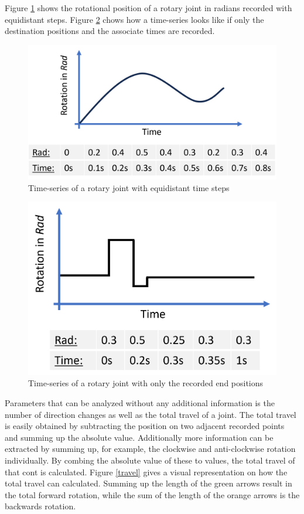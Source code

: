 Figure \ref{equi} shows the rotational position of a rotary joint in radians recorded with equidistant steps. Figure \ref{onchange} chows how a time-series looks like if only the destination positions and the associate times are recorded.

\begin{figure}[H]
	\centerline{\includegraphics[scale=.55]{figures/equi.png}}
	\caption{Time-series of a rotary joint with equidistant time steps}
	\label{equi}
\end{figure}

\begin{figure}[H]
	\centerline{\includegraphics[scale=.55]{figures/onchange.png}}
	\caption{Time-series of a rotary joint with only the recorded end positions}
	\label{onchange}
\end{figure}


Parameters that can be analyzed without any additional information is the number of direction changes as well as the total travel of a joint. The total travel is easily obtained by subtracting the position on two adjacent recorded points and summing up the absolute value. Additionally more information can be extracted by summing up, for example, the clockwise and anti-clockwise rotation individually. By combing the absolute value of these to values, the total travel of that cont is calculated.
Figure \ref{travel} gives a visual representation on how the total travel can calculated. Summing up the length of the green arrows result in the total forward rotation, while the sum of the length of the orange arrows is the backwards rotation.

